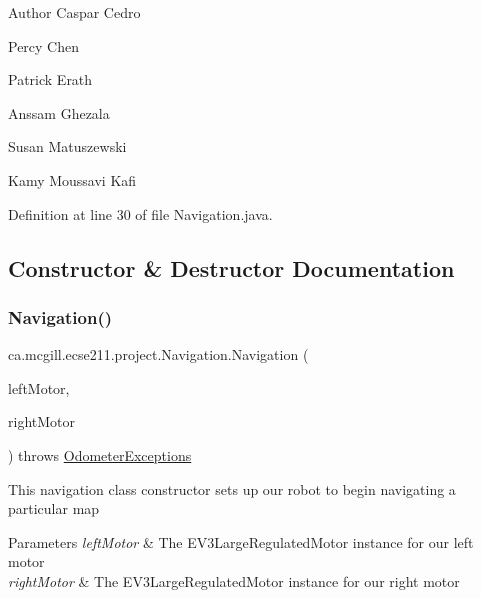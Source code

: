 \begin{DoxyAuthor}{Author}
Caspar Cedro 

Percy Chen 

Patrick Erath 

Anssam Ghezala 

Susan Matuszewski 

Kamy Moussavi Kafi 
\end{DoxyAuthor}


Definition at line 30 of file Navigation.\+java.



\subsection{Constructor \& Destructor Documentation}
\mbox{\label{classca_1_1mcgill_1_1ecse211_1_1project_1_1_navigation_aaee14b67c392ddd951e3ce21224c3e56}} 
\subsubsection{\texorpdfstring{Navigation()}{Navigation()}}
{\footnotesize\ttfamily ca.\+mcgill.\+ecse211.\+project.\+Navigation.\+Navigation (\begin{DoxyParamCaption}\item[{E\+V3\+Large\+Regulated\+Motor}]{left\+Motor,  }\item[{E\+V3\+Large\+Regulated\+Motor}]{right\+Motor }\end{DoxyParamCaption}) throws \hyperlink{classca_1_1mcgill_1_1ecse211_1_1odometer_1_1_odometer_exceptions}{Odometer\+Exceptions}}

This navigation class constructor sets up our robot to begin navigating a particular map


\begin{DoxyParams}{Parameters}
{\em left\+Motor} & The E\+V3\+Large\+Regulated\+Motor instance for our left motor \\
\hline
{\em right\+Motor} & The E\+V3\+Large\+Regulated\+Motor instance for our right motor \\
\hline
\end{DoxyParams}


